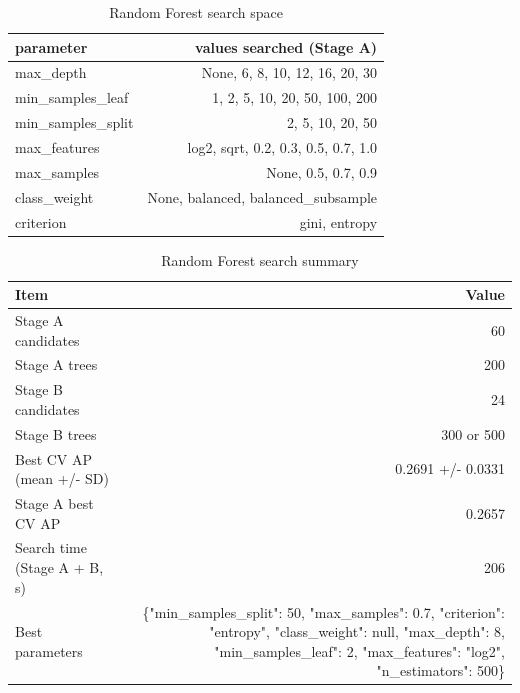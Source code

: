 \begin{table}[htbp]
\centering
\small
\caption{Random Forest search space}
\begin{tabular}{lr}
\toprule
parameter & values searched (Stage A) \\
\midrule
max\_depth & None, 6, 8, 10, 12, 16, 20, 30 \\
min\_samples\_leaf & 1, 2, 5, 10, 20, 50, 100, 200 \\
min\_samples\_split & 2, 5, 10, 20, 50 \\
max\_features & log2, sqrt, 0.2, 0.3, 0.5, 0.7, 1.0 \\
max\_samples & None, 0.5, 0.7, 0.9 \\
class\_weight & None, balanced, balanced\_subsample \\
criterion & gini, entropy \\
\bottomrule
\end{tabular}
\par\smallskip\begin{minipage}{\linewidth}\footnotesize \end{minipage}
\end{table}


\begin{table}[htbp]
\centering
\small
\caption{Random Forest search summary}
\begin{tabular}{lr}
\toprule
Item & Value \\
\midrule
Stage A candidates & 60 \\
Stage A trees & 200 \\
Stage B candidates & 24 \\
Stage B trees & 300 or 500 \\
Best CV AP (mean +/- SD) & 0.2691 +/- 0.0331 \\
Stage A best CV AP & 0.2657 \\
Search time (Stage A + B, s) & 206 \\
Best parameters & \{"min\_samples\_split": 50, "max\_samples": 0.7, "criterion": "entropy", "class\_weight": null, "max\_depth": 8, "min\_samples\_leaf": 2, "max\_features": "log2", "n\_estimators": 500\} \\
\bottomrule
\end{tabular}
\par\smallskip\begin{minipage}{\linewidth}\footnotesize \end{minipage}
\end{table}



